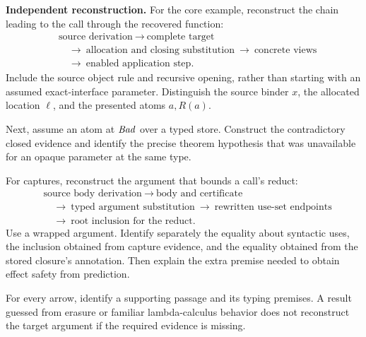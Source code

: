 \bigskip
\textbf{Independent reconstruction.}
For the core example, reconstruct the chain leading to the call through
the recovered function:
\[
 \begin{aligned}
 &\text{source derivation}\ \longrightarrow\ \text{complete target}\\
 &\quad\longrightarrow\ \text{allocation and closing substitution}
   \ \longrightarrow\ \text{concrete views}\\
 &\quad\longrightarrow\ \text{enabled application step}.
 \end{aligned}
\]
Include the source object rule and recursive opening, rather than starting
with an assumed exact-interface parameter. Distinguish the source binder
$x$, the allocated location $\ell$, and the presented atoms $a,R(a)$.

Next, assume an atom at $\mathit{Bad}$ over a typed store. Construct the
contradictory closed evidence and identify the precise theorem hypothesis
that was unavailable for an opaque parameter at the same type.

For captures, reconstruct the argument that bounds a call's reduct:
\[
 \begin{aligned}
 &\text{source body derivation}\ \longrightarrow\ \text{body and certificate}\\
 &\quad\longrightarrow\ \text{typed argument substitution}
   \ \longrightarrow\ \text{rewritten use-set endpoints}\\
 &\quad\longrightarrow\ \text{root inclusion for the reduct}.
 \end{aligned}
\]
Use a wrapped argument. Identify separately the equality about syntactic
uses, the inclusion obtained from capture evidence, and the equality
obtained from the stored closure's annotation. Then explain the extra
premise needed to obtain effect safety from prediction.

For every arrow, identify a supporting passage and its typing premises.
A result guessed from erasure or familiar lambda-calculus behavior does
not reconstruct the target argument if the required evidence is missing.
